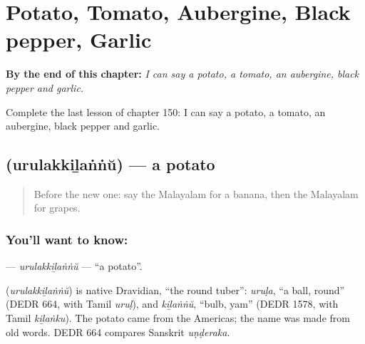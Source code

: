 
\chapter{Potato, Tomato, Aubergine, Black pepper, Garlic}
\label{ch:ml-potato-tomato-aubergine-black-pepper-garlic}

\begin{chapteropening}
\textbf{By the end of this chapter:} \emph{I can say a potato, a tomato, an aubergine, black pepper and garlic.}

Complete the last lesson of chapter 150: I can say a potato, a tomato, an aubergine, black pepper and garlic.
\end{chapteropening}

\section[\texorpdfstring{\ml{ഉരുളക്കിഴങ്ങ്} (urulakkiḻaṅṅŭ)}{ഉരുളക്കിഴങ്ങ് (urulakkiḻaṅṅŭ)}]{ (urulakkiḻaṅṅŭ) — a potato}

\label{lesson:ML-C150-urulakkilannu}



\begin{quote}
Before the new one: say the Malayalam for a banana, then the Malayalam for grapes.
\end{quote}

\subsection*{You'll want to know: }
\textbf{} — \emph{urulakkiḻaṅṅŭ} — \textquotedblleft{}a potato\textquotedblright{}.

\begin{cousinweb}
\textbf{} (\emph{urulakkiḻaṅṅŭ}) is native Dravidian, \textquotedblleft{}the round tuber\textquotedblright{}: \emph{uruḷa}, \textquotedblleft{}a ball, round\textquotedblright{} (DEDR 664, with Tamil \emph{uruḷ}), and \emph{kiḻaṅṅŭ}, \textquotedblleft{}bulb, yam\textquotedblright{} (DEDR 1578, with Tamil \emph{kiḻaṅku}). The potato came from the Americas; the name was made from old words. DEDR 664 compares Sanskrit \emph{uṇḍeraka}.
\end{cousinweb}

